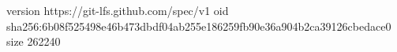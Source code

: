 version https://git-lfs.github.com/spec/v1
oid sha256:6b08f525498e46b473dbdf04ab255e186259fb90e36a904b2ca39126cbedace0
size 262240
